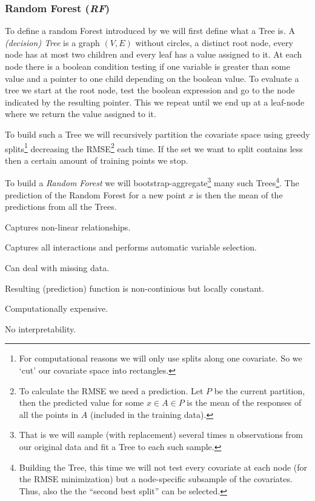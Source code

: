 \subsubsection*{Random Forest (\textit{RF})}{
    To define a random Forest introduced by \cite{breimanRandomForests2001}  we will first define what a Tree is. A \textit{(decision) Tree} is a graph $(V,E)$ without circles, a distinct root node, every node has at most two children and every leaf has a value assigned to it. At each node there is a boolean condition testing if one variable is greater than some value and a pointer to one child depending on the boolean value. To evaluate a tree we start at the root node, test the boolean expression and go to the node indicated by the resulting pointer. This we repeat until we end up at a leaf-node where we return the value assigned to it. 
    
    To build such a Tree we will recursively partition the covariate space using greedy splits\footnote{For computational reasons we will only use splits along one covariate. So we `cut' our covariate space into rectangles.} decreasing the RMSE\footnote{To calculate the RMSE we need a prediction. Let $P$ be the current partition, then the predicted value for some $x\in A \in P$ is the mean of the responses of all the points in $A$ (included in the training data).} each time. If the set we want to split contains less then a certain amount of training points we stop.
    
    To build a \textit{Random Forest} we will bootstrap-aggregate\footnote{That is we will sample (with replacement) several times n observations from our original data and fit a Tree to each such sample.} many such Trees\footnote{Building the Tree, this time we will not test every covariate at each node (for the RMSE minimization) but a node-specific subsample of the covariates. Thus, also the the ``second best split'' can be selected.}. The prediction of the Random Forest for a new point $x$ is then the mean of the predictions from all the Trees. 
    \begin{my_pros_cons_table}{
        \item Captures non-linear relationships.
        \item Captures all interactions and performs automatic variable selection.
        \item Can deal with missing data.
    }{
        \item Resulting (prediction) function is non-continious but locally constant.
        \item Computationally expensive.
        \item No interpretability.
    }
    \end{my_pros_cons_table}
}

